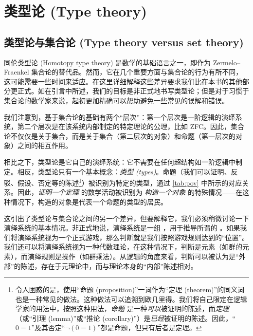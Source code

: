 \chapter{类型论 (Type theory)}
\label{cha:typetheory}

\section{类型论与集合论 (Type theory versus set theory)}
\label{sec:types-vs-sets}
\label{sec:axioms}

同伦类型论 (Homotopy type theory) 是数学的基础语言之一，即作为 Zermelo–Fraenkel 集合论的替代品。然而，它在几个重要方面与集合论的行为有所不同，这可能需要一些时间来适应。在这里详细解释这些差异要求我们比在本书的其他部分更正式。如在引言中所述，我们的目标是非正式地书写类型论；但是对于习惯于集合论的数学家来说，起初更加精确可以帮助避免一些常见的误解和错误。

我们注意到，基于集合论的基础有两个“层次”：第一个层次是一阶逻辑的演绎系统，第二个层次是在该系统内部制定的特定理论的公理，比如 ZFC。因此，集合论不仅仅是关于集合，而是关于集合（第二层次的对象）和命题（第一层次的对象）之间的相互作用。

相比之下，类型论是它自己的演绎系统：它不需要在任何超结构如一阶逻辑中制定。相反，类型论只有一个基本概念：\emph{类型 (types)}。命题（我们可以证明、反驳、假设、否定等的陈述\footnote{令人困惑的是，使用“命题 (proposition)”一词作为“定理 (theorem)”的同义词也是一种常见的做法。这种做法可以追溯到欧几里得。我们将自己限定在逻辑学家的用法中，按照这种用法，\emph{命题} 是一种\emph{可以}被证明的陈述，而\emph{定理}（或“引理 (lemma)”或“推论 (corollary)”）是\emph{已经}被证明的陈述。因此，“$0=1$”及其否定“$\neg(0=1)$”都是命题，但只有后者是定理。}）被识别为特定的类型，通过 \cref{tab:pov} 中所示的对应关系。因此，\emph{证明一个定理} 的数学活动被识别为 \emph{构造一个对象} 的特殊情况——在这种情况下，构造的对象是代表一个命题的类型的居民。

%
这引出了类型论与集合论之间的另一个差异，但要解释它，我们必须稍微讨论一下演绎系统的基本情况。非正式地说，演绎系统是一组 ，用于推导所谓的 。如果我们将演绎系统视为一个正式游戏，那么判断就是我们按照游戏规则达到的“位置”。我们还可以将演绎系统视为一种代数理论，在这种情况下，判断是元素（如群的元素），而演绎规则是操作（如群乘法）。从逻辑的角度来看，判断可以被认为是“外部”的陈述，存在于元理论中，而与理论本身的“内部”陈述相对。

